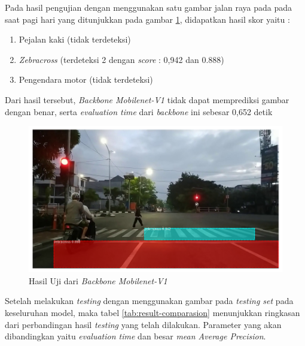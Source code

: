 Pada hasil pengujian dengan menggunakan satu gambar jalan raya pada pada saat pagi hari yang ditunjukkan pada gambar \ref{fig:hasil-mobilenetv1}, didapatkan hasil skor yaitu :
\begin{enumerate}[nolistsep]
	\item Pejalan kaki (tidak terdeteksi)
	\item \textit{Zebracross} (terdeteksi 2  dengan \textit{score} : 0,942 dan 0.888)
	\item Pengendara motor (tidak terdeteksi)
\end{enumerate}
Dari hasil tersebut, \textit{Backbone Mobilenet-V1} tidak dapat memprediksi gambar dengan benar, serta \textit{evaluation time} dari \textit{backbone} ini sebesar 0,652 detik
\begin{figure}[h] 
	\centering
	\includegraphics[scale=0.3]{gambar/fajar-frame800-mobilenetv1.png}
	\caption{Hasil Uji dari \textit{Backbone Mobilenet-V1}}
	\label{fig:hasil-mobilenetv1}
\end{figure}

Setelah melakukan \textit{testing} dengan menggunakan gambar pada \textit{testing set} pada keseluruhan model, maka tabel \ref{tab:result-comparasion} menunjukkan ringkasan dari perbandingan hasil \textit{testing} yang telah dilakukan. Parameter yang akan dibandingkan yaitu \textit{evaluation time} dan besar \textit{mean Average Precision}.

\begin{table}[h]
	\centering
	\caption{tabel Perbandingan Hasil \textit{Testing}}
	\label{tab:result-comparasion}
\end{table}

